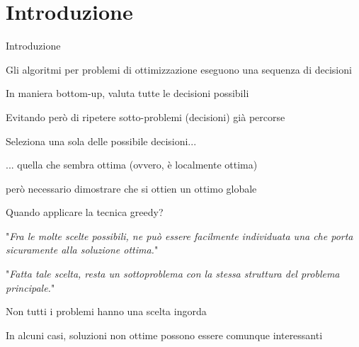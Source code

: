\FrameContent



\section{Introduzione}

\begin{frame}{Introduzione}

\vspace{-9pt}
\begin{myboxtitle}
\BI
\item Gli algoritmi per problemi di ottimizzazione eseguono una sequenza di decisioni
\EI
\end{myboxtitle}

\begin{myboxtitle}
\BI
\item In maniera bottom-up, valuta tutte le decisioni possibili
\item Evitando però di ripetere sotto-problemi (decisioni) già percorse
\EI
\end{myboxtitle}

\begin{myboxtitle}
\BI
\item Seleziona una sola delle possibile decisioni...
\item ... quella che sembra ottima (ovvero, è localmente ottima)
\item \EE però necessario dimostrare che si ottien un ottimo globale
\EI
\end{myboxtitle}
\end{frame}


\begin{frame}{Quando applicare la tecnica greedy?}

\vspace{-9pt}
\begin{myboxtitle}
"\emph{Fra le molte scelte possibili, ne può essere facilmente individuata una che porta sicuramente alla soluzione ottima.}"
\end{myboxtitle}

\begin{myboxtitle}
"\emph{Fatta tale scelta, resta un sottoproblema con la stessa struttura del problema principale.}"
\end{myboxtitle}

\begin{myboxtitle}[Note]
\BI
\item Non tutti i problemi hanno una scelta ingorda
\item In alcuni casi, soluzioni non ottime possono essere comunque interessanti
\EI
\end{myboxtitle}

\end{frame}

